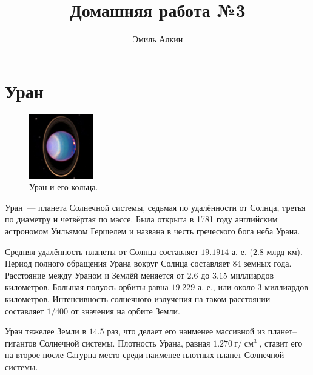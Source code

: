 \documentclass{article}
\title{Домашняя работа №3}
\author{Эмиль Алкин}
\date{}
\DeclareMathOperator{\cm}{\text{см}}
\begin{document}
	\maketitle
	\section{Уран}
	\begin{figure}
    	\centering 
    	\includegraphics[width = 0.25\textwidth]{img/Uranusandrings}
    	\caption{Уран и его кольца.}
    \end{figure}  
    \hspace*{12pt} Уран~--- планета Солнечной системы, седьмая по удалённости от Солнца, третья по диаметру и четвёртая по массе. Была открыта в 1781 году английским астрономом Уильямом Гершелем и названа в честь греческого бога неба Урана.\par
    Средняя удалённость планеты от Солнца составляет $19.1914$ а. е. ($2.8$ млрд км). Период полного обращения Урана вокруг Солнца составляет $84$ земных года. Расстояние между Ураном и Землёй меняется от $2.6$ до $3.15$ миллиардов километров. Большая полуось орбиты равна $19.229$ а. е., или около $3$ миллиардов километров. Интенсивность солнечного излучения на таком расстоянии составляет $1/400$ от значения на орбите Земли.\par 
    Уран тяжелее Земли в $14.5$ раз, что делает его наименее массивной из планет--гигантов Солнечной системы. Плотность Урана, равная $1.270~\text{г}/\cm^3 $, ставит его на второе после Сатурна место среди наименее плотных планет Солнечной системы.
\end{document}
